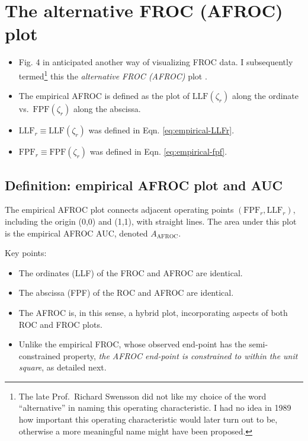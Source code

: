 \documentclass[
]{book}
\providecommand{\tightlist}{%
  \setlength{\itemsep}{0pt}\setlength{\parskip}{0pt}}
\begin{document}
\hypertarget{empirical-AFROC}{%
\section{The alternative FROC (AFROC) plot}\label{empirical-AFROC}}

\begin{itemize}
\tightlist
\item
  Fig. 4 in \citep{bunch1977free} anticipated another way of visualizing FROC data. I subsequently termed\footnote{The late Prof.~Richard Swensson did not like my choice of the word ``alternative'' in naming this operating characteristic. I had no idea in 1989 how important this operating characteristic would later turn out to be, otherwise a more meaningful name might have been proposed.} this the \emph{alternative FROC (AFROC)} plot \citep{chakraborty1989maximum}.
\item
  The empirical AFROC is defined as the plot of \(\text{LLF}(\zeta_r)\) along the ordinate vs.~\(\text{FPF}(\zeta_r)\) along the abscissa.
\item
  \(\text{LLF}_r \equiv \text{LLF}(\zeta_r)\) was defined in Eqn. \eqref{eq:empirical-LLFr}.
\item
  \(\text{FPF}_r \equiv \text{FPF}(\zeta_r)\) was defined in Eqn. \eqref{eq:empirical-fpf}.
\end{itemize}

\hypertarget{empirical-definition-empirical-auc-afroc}{%
\subsection{Definition: empirical AFROC plot and AUC}\label{empirical-definition-empirical-auc-afroc}}

The empirical AFROC plot connects adjacent operating points \(\left( \text{FPF}_r, \text{LLF}_r \right )\), including the origin (0,0) and (1,1), with straight lines. The area under this plot is the empirical AFROC AUC, denoted \(A_{\text{AFROC}}\).

Key points:

\begin{itemize}
\tightlist
\item
  The ordinates (LLF) of the FROC and AFROC are identical.
\item
  The abscissa (FPF) of the ROC and AFROC are identical.
\item
  The AFROC is, in this sense, a hybrid plot, incorporating aspects of both ROC and FROC plots.
\item
  Unlike the empirical FROC, whose observed end-point has the semi-constrained property, \emph{the AFROC end-point is constrained to within the unit square}, as detailed next.
\end{itemize}
\end{document}
